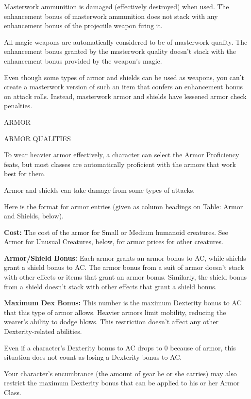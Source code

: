 \documentclass{article}
\begin{document}
Masterwork ammunition is damaged (effectively destroyed) when used. The enhancement 
bonus of masterwork ammunition does not stack with any enhancement bonus of the 
projectile weapon firing it.

All magic weapons are automatically considered to be of masterwork quality. The 
enhancement bonus granted by the masterwork quality doesn't stack with the enhancement 
bonus provided by the weapon's magic.

Even though some types of armor and shields can be used as weapons, you can't create 
a masterwork version of such an item that confers an enhancement bonus on attack 
rolls. Instead, masterwork armor and shields have lessened armor check penalties.

\vspace{12pt}
{\LARGE{}ARMOR}

\vspace{12pt}
ARMOR QUALITIES

To wear heavier armor effectively, a character can select the Armor Proficiency 
feats, but most classes are automatically proficient with the armors that work 
best for them.

Armor and shields can take damage from some types of attacks. 

Here is the format for armor entries (given as column headings on Table: Armor 
and Shields, below).

\textbf{Cost:} The cost of the armor for Small or Medium humanoid creatures. See 
Armor for Unusual Creatures, below, for armor prices for other creatures.

\vspace{12pt}
\textbf{Armor/Shield Bonus:} Each armor grants an armor bonus to AC, while shields 
grant a shield bonus to AC. The armor bonus from a suit of armor doesn't stack 
with other effects or items that grant an armor bonus. Similarly, the shield bonus 
from a shield doesn't stack with other effects that grant a shield bonus.

\textbf{Maximum Dex Bonus:} This number is the maximum Dexterity bonus to AC that 
this type of armor allows. Heavier armors limit mobility, reducing the wearer's 
ability to dodge blows. This restriction doesn't affect any other Dexterity-related 
abilities.

Even if a character's Dexterity bonus to AC drops to 0 because of armor, this situation 
does not count as losing a Dexterity bonus to AC. 

Your character's encumbrance (the amount of gear he or she carries) may also restrict 
the maximum Dexterity bonus that can be applied to his or her Armor Class.
\end{document}
